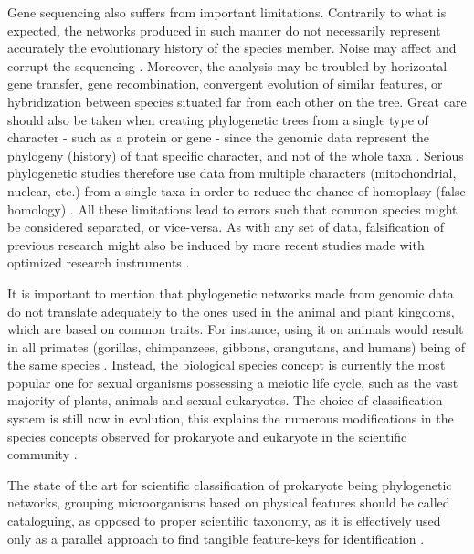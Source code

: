 Gene sequencing also suffers from important limitations. Contrarily to what is expected, the networks produced in such manner do not necessarily represent accurately the evolutionary history of the species member. Noise may affect and corrupt the sequencing \cite{kapli2020phylogenetic}. Moreover, the analysis may be troubled by horizontal gene transfer, gene recombination, convergent evolution of similar features, or hybridization between species situated far from each other on the tree. Great care should also be taken when creating phylogenetic trees from a single type of character - such as a protein or gene - since the genomic data represent the phylogeny (history) of that specific character, and not of the whole taxa \cite{kapli2020phylogenetic,Nosenko2013}. Serious phylogenetic studies therefore use data from multiple characters (mitochondrial, nuclear, etc.) from a single taxa in order to reduce the chance of homoplasy (false homology) \cite{kapli2020phylogenetic,Nosenko2013}. All these limitations lead to errors such that common species might be considered separated, or vice-versa. As with any set of data, falsification of previous research might also be induced by more recent studies made with optimized research instruments \cite{kapli2020phylogenetic}. \par

It is important to mention that phylogenetic networks made from genomic data do not translate adequately to the ones used in the animal and plant kingdoms, which are based on common traits. For instance, using it on animals would result in all primates (gorillas, chimpanzees, gibbons, orangutans, and humans) being of the same species \cite{Xu2006}. Instead, the biological species concept is currently the most popular one for sexual organisms possessing a meiotic life cycle, such as the vast majority of plants, animals and sexual eukaryotes. The choice of classification system is still now in evolution, this explains the numerous modifications in the species concepts observed for prokaryote and eukaryote in the scientific community \cite{Xu2006}. \par

The state of the art for scientific classification of prokaryote being phylogenetic networks, grouping microorganisms based on physical features should be called cataloguing, as opposed to proper scientific taxonomy, as it is effectively used only as a parallel approach to find tangible feature-keys for identification \cite{Sneath1957}.